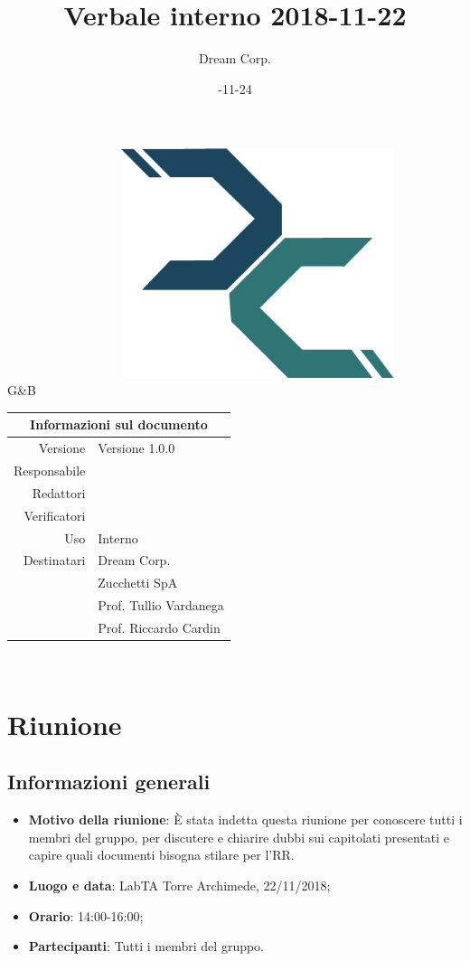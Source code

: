 \documentclass[12pt]{article}
\title{\myfont Verbale interno 2018-11-22}
\author{Dream Corp.}
\date{\myfont 2018-11-24}
\newcommand{\red}{\mat}
\newcommand{\verp}{\daL}
\newcommand{\res}{\daG}
\newcommand{\version}{Versione 1.0.0}
\newcommand{\use}{Interno}
\begin{document}
\maketitle
	\begin{center}
	~~~~~~~~~~~~~~~~~~\includegraphics[width = 80mm]{../../logo.png}
	\newline
	\huge 
	\\G\&B
	
	\begin{table}[!htpb]
		\centering
		\begin{tabular}{r|l}
			\multicolumn{2}{c}{Informazioni sul documento}\\
			\hline
			Versione & \version \\
			Responsabile & \res\\
			Redattori & \red \\
			Verificatori & \verp\\
			Uso & \use\\
			Destinatari & Dream Corp. \\
			& Zucchetti SpA\\
			& Prof. Tullio Vardanega\\
			& Prof. Riccardo Cardin\\
		\end{tabular}
	\end{table}
	
	\end{center}
	\newpage

\newline
~\newline
\section{Riunione}
    \subsection{Informazioni generali}
    \begin{itemize}
        \item \textbf{Motivo della riunione}: È stata indetta questa riunione per conoscere tutti i membri del gruppo, per discutere e chiarire dubbi sui capitolati presentati e capire quali documenti bisogna stilare per l'RR.
        \item \textbf{Luogo e data}: LabTA Torre Archimede, 22/11/2018;
        \item \textbf{Orario}: 14:00-16:00;
        \item \textbf{Partecipanti}: Tutti i membri del gruppo.

    \end{itemize}
    \newpage
\end{document}
